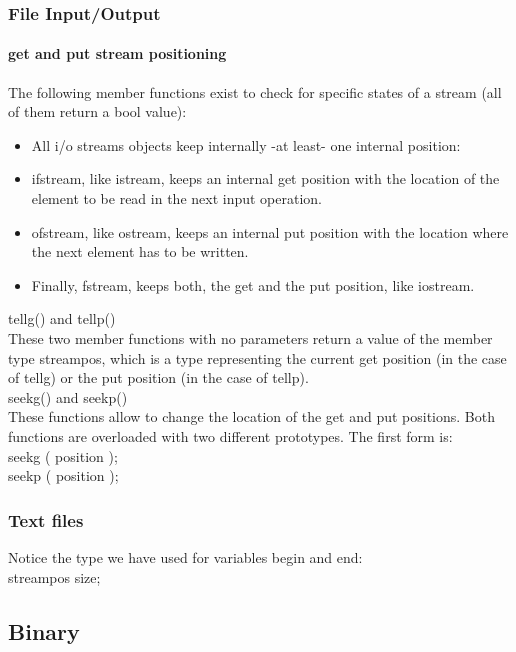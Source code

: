 \documentclass[hyperref={pdfpagelabels=true}]{beamer}
\begin{document}
\begin{frame}
\frametitle{File Input/Output}
\framesubtitle{get and put stream positioning}
\scriptsize
The following member functions exist to check for specific states of a stream (all of them return a bool value): 
\begin{itemize}[<+->]
\item All i/o streams objects keep internally -at least- one internal position:
\item ifstream, like istream, keeps an internal get position with the location of the element to be read in the next input operation.
\item ofstream, like ostream, keeps an internal put position with the location where the next element has to be written.
\item Finally, fstream, keeps both, the get and the put position, like iostream.
\end{itemize}

\alert{tellg()} and \alert{tellp()}\\
These two member functions with no parameters return a value of the member type streampos, which is a type representing the current get position (in the case of tellg) or the put position (in the case of tellp).\\

\alert{seekg()} and \alert{seekp()}\\
These functions allow to change the location of the get and put positions. Both functions are overloaded with two different prototypes. The first form is:\\
\alert{seekg ( position );}\\
\alert{seekp ( position );}
\end{frame}



\begin{frame}[shrink]
\frametitle{Text files}
\begin{tcolorbox}[title= ,width=14.85 cm]
\scriptsize

\end{tcolorbox}
Notice the type we have used for variables begin and end:\\ 
streampos size;
\end{frame}

\subsection{Binary}
\end{document}
